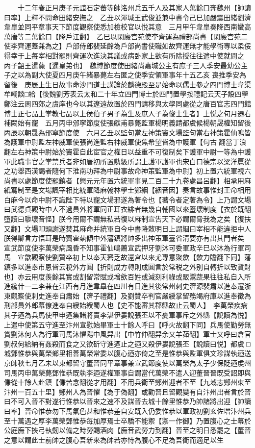 　　十二年春正月庚子元誼石定蕃等帥洺州兵五千人及其家人萬餘口奔魏州【帥讀曰率】上釋不問命田緒安撫之　乙丑以渾瑊王武俊並兼中書令己巳加嚴震田緒劉濟韋臯並同平章事天下節度觀察使悉加檢校官以悦其意　三月甲午韋臯奏降西南蠻高萬唐等二萬餘口【降戶江翻】　乙巳以閑廄宫苑使李齊運為禮部尚書【閑廄宫苑二使李齊運蓋兼為之】戶部侍郎裴延齡為戶部尚書使職如故齊運無才能學術專以柔佞得幸于上每宰相對罷則齊運次進決其議或病卧家上欲有所除授往往遣中使就問之　丙子韶王暹薨【暹皇弟也】　魏博節度使田緒尚嘉城公主有庶子三人季安最幼公主子之以為副大使夏四月庚午緒暴薨左右匿之使季安領軍事年十五乙亥喪推季安為留後　庚辰上生日故事命沙門道士講論於麟德殿至是始命以儒士參之四門博士韋渠牟嘲談□給【後魏劉芳表云太和二十年立四門博士於四門置學按禮記云天子設四學鄭注云周四郊之虞庠也今以其遼遠故置於四門請移與太學同處從之唐百官志四門館博士正七品上掌教七品以上侯伯子男子為生及庶人子為俊士生者】上悦之旬月遷右補闕始有寵　五月丙申邠寧節度使張獻甫暴薨監軍楊明義請都虞候楊朝晟權知留後丙辰以朝晟為邠寧節度使　六月乙丑以監句當左神策竇文場監句當右神策霍仙鳴皆為護軍中尉監左神威軍使張尚進監右神威軍使焦希望皆為中護軍【句古翻當丁浪翻左右神策中尉始於竇霍自此宦官之權日以益重不可復制矣下護軍中尉一等為中護軍此職事官之掌禁兵者非如唐初所置勲級所謂上護軍護軍也宋白曰德宗以梁洋扈從之功舉西漢謁者隨何下淮南功拜為中尉事故命神策監軍為中尉】初上置六統軍視六尚書以處節度使罷鎮者【興元元年置六統軍事見二百二十九卷處昌呂翻】相承用麻紙寫制至是文場諷宰相比統軍降麻翰林學士鄭絪【絪音因】奏言故事惟封王命相用白麻今以命中尉不識陛下特以寵文場邪遂為著令也【著令者定著為令】上乃謂文場曰武德貞觀時中人不過員外將軍同正耳衣緋者無幾自輔國以來墮壞制度【衣於既翻墮讀曰隳壞音怪】朕今用爾不謂無私若復以麻制宣告天下必謂爾脅我為之矣【復扶又翻】文場叩頭謝遂焚其麻命并統軍自今中書降敕明日上謂絪曰宰相不能違拒中人朕得卿言方悟耳是時竇霍埶傾中外藩鎮將帥多出神策軍臺省清要亦有出其門者矣　宣武節度使李萬榮病風昏不知事霍仙鳴薦宣武押牙劉沐可委軍政辛巳以沐為行軍司馬　宣歙觀察使劉贊卒初上以奉天窘乏故還宫以來尤專意聚歛【歛力贍翻下同】藩鎮多以進奉市恩皆云稅外方圓【折則成方轉則成圓言於常税之外别自轉折以致貨財也】亦云用度羨餘其實或割留常賦或增歛百姓或減刻利祿或販鬻蔬果往往私自入所進纔什一二李兼在江西有月進韋臯在四川有日進其後常州刺史濟源裴肅以進奉遷浙東觀察使刺史進奉自肅始【濟子禮翻】及劉贊卒判官嚴綬掌留務竭府庫以進奉徵為刑部員外郎幕僚進奉自綬始綬蜀人也【史不能審其郡縣故止云蜀人】　李萬榮疾病其子迺為兵馬使甲申迺集諸將責李湛伊婁說張丕以不憂軍事斥之外縣【說讀為悦】上遣中使第五守進至汴州宣慰始畢軍士十餘人呼曰【呼火故翻下同】兵馬使勤勞無賞劉沐何人為行軍司馬沐懼陽中風舁出【中竹仲翻舁余又羊茹翻】軍士又呼曰倉官劉叔何給納有姦殺而食之又欲斫守進迺止之迺又殺伊婁說張丕【說讀曰悦】都虞□城鄧惟恭與萬榮鄉里相善萬榮常委以腹心迺亦倚之至是惟恭與監軍俱文珍謀執迺送京師秋七月乙未以東都留守董晉同平章事兼宣武節度使以萬榮為太子少保貶迺䖍州司馬丙申萬榮薨鄧惟恭既執李迺遂權軍事自謂當代萬榮不遣人迎董晉晉既受詔即與傔從十餘人赴鎮【傔苦念翻從才用翻】不用兵衛至鄭州迎者不至【九域志鄭州東至汴州一百五十里】鄭州人為晉懼【為于偽翻】或勸晉且留觀變有自汴州出者言於晉曰不可入晉不對遂行惟恭以晉來之速不及謀晉去城十餘里惟恭乃帥諸將出迎【帥讀曰率】晉命惟恭勿下馬氣色甚和惟恭差自安既入仍委惟恭以軍政初劉玄佐增汴州兵至十萬遇之厚李萬榮鄧惟恭每加厚焉士卒驕不能禦【禦一作御】乃置腹心之士幕於公庭廡下挾弓執劒以備之時勞賜酒肉【廡音武勞力到翻】晉至之明日悉罷之【董晉之意以謂此士前帥之腹心吾新來為帥若亦恃為腹心不足為吾衛而適足以生